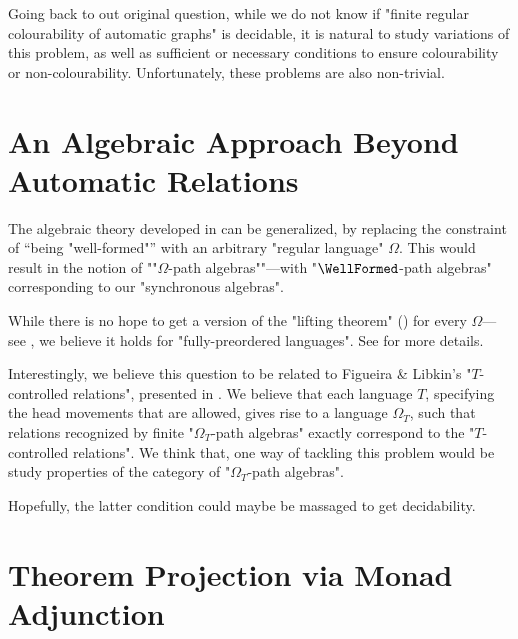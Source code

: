 Going back to out original question,
while we do not know if "finite regular colourability of automatic graphs"
is decidable, it is natural to study variations of this problem, as well as
sufficient or necessary conditions to ensure colourability or non-colourability.
Unfortunately, these problems are also non-trivial.

\conjFiniteColourabilityUndecidable*

\conjUnboundedCliques*

\section{An Algebraic Approach Beyond Automatic Relations}

The algebraic theory developed in  can be generalized,
by replacing the constraint of ``being "well-formed"'' with an arbitrary
"regular language" $\Omega$. This would result in the notion
of \AP""$\Omega$-path algebras""---with "$\WellFormed$-path algebras" corresponding
to our "synchronous algebras".

While there is no hope to get a version of the
"lifting theorem" () for every $\Omega$---see , we believe it holds for "fully-preordered languages".
See  for more details.

Interestingly, we believe this question to be related to Figueira \& Libkin's
"$T$-controlled relations", presented in
.
We believe that each language $T$, specifying the head movements that are allowed,
gives rise to a language $\Omega_T$, such that relations recognized
by finite "$\Omega_T$-path algebras" exactly correspond to 
the "$T$-controlled relations".
\opbControlledRelations
We think that, one way of tackling this problem would be study properties of
the category of "$\Omega_T$-path algebras".

\conjAdjunctionControlledRelations*

Hopefully, the latter condition could maybe be massaged to get decidability.


\section{Theorem Projection via Monad Adjunction}

